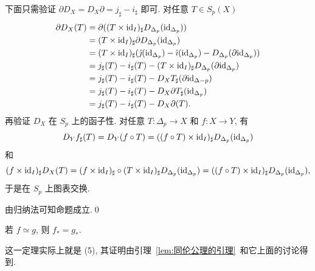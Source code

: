 \begin{Proof}
	下面只需验证 $ \partial D_X=D_X\partial=j_\sharp-i_\sharp $ 即可. 对任意 $ T\in S_p(X) $
	\[
		\begin{aligned}
			\partial D_X(T)&=\partial((T\times\mathrm{id}_I)_\sharp D_{\Delta_p}(\mathrm{id}_{\Delta_p}))\\
			&=(T\times\mathrm{id}_I)_\sharp\partial D_{\Delta_p}(\mathrm{id}_{\Delta_p})\\
			&=(T\times\mathrm{id}_I)_\sharp(\hat{\jmath}(\mathrm{id}_{\Delta_p})-\hat{\imath}(\mathrm{id}_{\Delta_p})-D_{\Delta_p}(\partial\mathrm{id}_{\Delta_p}))\\
			&=j_\sharp(T)-i_\sharp(T)-(T\times\mathrm{id}_{I})_\sharp D_{\Delta_p}(\partial\mathrm{id}_{\Delta_p})\\
			&=j_\sharp(T)-i_\sharp(T)-D_XT_\sharp(\partial\mathrm{id}_{\Delta-p})\\
			&=j_\sharp(T)-i_\sharp(T)-D_X\partial T_\sharp(\mathrm{id}_{\Delta_p})\\
			&=j_\sharp(T)-i_\sharp(T)-D_X\partial(T).
		\end{aligned}
	\]
	再验证 $ D_X $ 在 $ S_p $ 上的函子性. 对任意 $ T : \Delta_p\to X $ 和 $ f : X\to Y $, 有
	\[
		D_Yf_\sharp(T)=D_Y(f\circ T)=((f\circ T)\times\mathrm{id}_I)_\sharp D_{\Delta_p}(\mathrm{id}_{\Delta_p})
	\]
	和
	\[
		(f\times\mathrm{id}_I)_\sharp D_X(T)=(f\times\mathrm{id}_I)_\sharp\circ(T\times\mathrm{id}_I)_\sharp D_{\Delta_p}(\mathrm{id}_{\Delta_p})=((f\circ T)\times\mathrm{id}_I)_\sharp D_{\Delta_p}(\mathrm{id}_{\Delta_p}),
	\]
	于是在 $ S_p $ 上图表交换.

	由归纳法可知命题成立.\qed
\end{Proof}

\begin{Theorem}
	若 $ f\simeq g $, 则 $ f_*=g_* $.
\end{Theorem}

这一定理实际上就是 (5), 其证明由引理~\ref{lem:同伦公理的引理}~和它上面的讨论得到.

